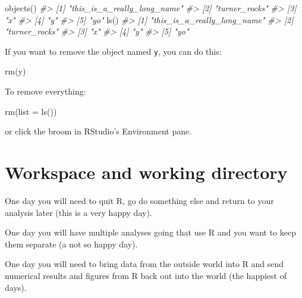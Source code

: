 \documentclass[
]{book}
\newenvironment{Shaded}{\begin{snugshade}}{\end{snugshade}}
\newcommand{\AttributeTok}[1]{\textcolor[rgb]{0.77,0.63,0.00}{#1}}
\newcommand{\CommentTok}[1]{\textcolor[rgb]{0.56,0.35,0.01}{\textit{#1}}}
\newcommand{\FunctionTok}[1]{\textcolor[rgb]{0.00,0.00,0.00}{#1}}
\newcommand{\NormalTok}[1]{#1}
\begin{document}
\begin{Shaded}
\begin{Highlighting}[]
\FunctionTok{objects}\NormalTok{()}
\CommentTok{\#\textgreater{} [1] "this\_is\_a\_really\_long\_name"}
\CommentTok{\#\textgreater{} [2] "turner\_rocks"              }
\CommentTok{\#\textgreater{} [3] "x"                         }
\CommentTok{\#\textgreater{} [4] "y"                         }
\CommentTok{\#\textgreater{} [5] "yo"}
\FunctionTok{ls}\NormalTok{()}
\CommentTok{\#\textgreater{} [1] "this\_is\_a\_really\_long\_name"}
\CommentTok{\#\textgreater{} [2] "turner\_rocks"              }
\CommentTok{\#\textgreater{} [3] "x"                         }
\CommentTok{\#\textgreater{} [4] "y"                         }
\CommentTok{\#\textgreater{} [5] "yo"}
\end{Highlighting}
\end{Shaded}

If you want to remove the object named \texttt{y}, you can do this:

\begin{Shaded}
\begin{Highlighting}[]
\FunctionTok{rm}\NormalTok{(y)}
\end{Highlighting}
\end{Shaded}

To remove everything:

\begin{Shaded}
\begin{Highlighting}[]
\FunctionTok{rm}\NormalTok{(}\AttributeTok{list =} \FunctionTok{ls}\NormalTok{())}
\end{Highlighting}
\end{Shaded}

or click the broom in RStudio's Environment pane.

\hypertarget{workspace-and-working-directory}{%
\section{Workspace and working directory}\label{workspace-and-working-directory}}

One day you will need to quit R, go do something else and return to your analysis later (this is a very happy day).

One day you will have multiple analyses going that use R and you want to keep them separate (a not so happy day).

One day you will need to bring data from the outside world into R and send numerical results and figures from R back out into the world (the happiest of days).
\end{document}
